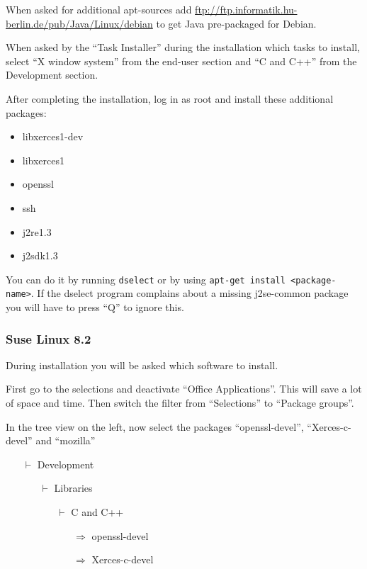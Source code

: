 \documentclass{article}
\begin{document}
When asked for additional apt-sources add
\url{ftp://ftp.informatik.hu-berlin.de/pub/Java/Linux/debian} to get
Java pre-packaged for Debian.

When asked by the ``Task Installer'' during the installation which
tasks to install, select ``X window system'' from the end-user section
and ``C and C++'' from the Development section.

After completing the installation, log in as root and install these
additional packages: 

\begin{itemize}
\item libxerces1-dev
\item libxerces1
\item openssl
\item ssh 
\item j2re1.3
\item j2sdk1.3
\end{itemize}

You can do it by running \verb|dselect| or by using 
\verb|apt-get install <package-name>|. If the dselect program complains about a
missing j2se-common package you will have to press ``Q'' to ignore
this.

\subsubsection{Suse Linux 8.2}

During installation you will be asked which software to install.

First go to the selections and deactivate ``Office Applications''.
This will save a lot of space and time.  Then switch the filter from
``Selections'' to ``Package groups''.

\parbox{\textwidth}{
  In the tree view on the left, now select the packages ``openssl-devel'', ``Xerces-c-devel''
and ``mozilla''
  \begin{itemize}
  \item[$\vdash$] Development
    \begin{itemize}
    \item[$\vdash$] Libraries
      \begin{itemize}
      \item[$\vdash$] C and C++
        
        
        \begin{itemize}
        \item[$\Rightarrow$] openssl-devel
          
        \item[$\Rightarrow$] Xerces-c-devel
        \end{itemize}
        
      \end{itemize}
    \end{itemize}
  \end{itemize}
}\par
\end{document}
